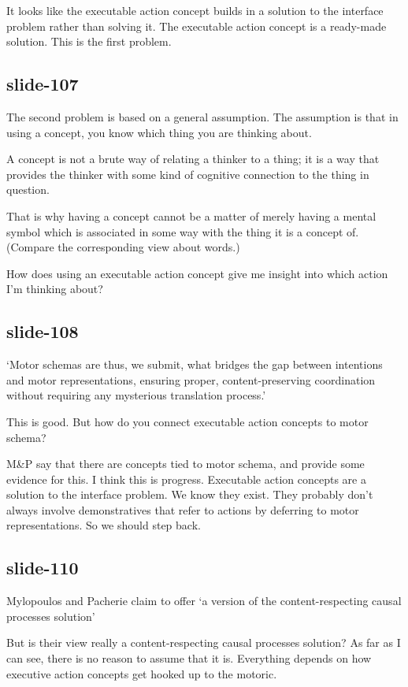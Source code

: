 \documentclass[12pt,\papersize]{extarticle}
\begin{document}
It looks like the executable action concept builds in a solution to the interface problem
rather than solving it.
The executable action concept is a ready-made solution.
This is the first problem.

\subsection{slide-107}
The second problem is based on a general assumption.
The assumption is that in using a concept, you know which thing you are thinking about.

A concept is not a brute way of relating a thinker to a thing; it is a way that provides
the thinker with some kind of cognitive connection to the thing in question.

That is why having a concept cannot be a matter of merely having a mental symbol
which is associated in some way with the thing it is a concept of.
(Compare the corresponding view about words.)

How does using an executable action concept give me insight into which action I’m thinking
about?

\subsection{slide-108}
‘Motor schemas are thus, we submit, what bridges the gap between intentions and motor representations, ensuring proper, content-preserving coordination without requiring any mysterious translation process.’

This is good.  But how do you connect executable action concepts to motor schema?

M\&P say that there are concepts tied to motor schema, and provide some evidence
for this.  I think this is progress.
Executable action concepts are a solution to the interface problem. We know they exist.
They probably don’t always involve demonstratives that refer to actions by deferring to
motor representations.
So we should step back.

\subsection{slide-110}
Mylopoulos and Pacherie claim to offer ‘a version of the content-respecting causal
processes solution’

But is their view really a content-respecting causal processes solution?
As far as I can see, there is no reason to assume that it is.
Everything depends on how executive action concepts get hooked up to
the motoric.
\end{document}
